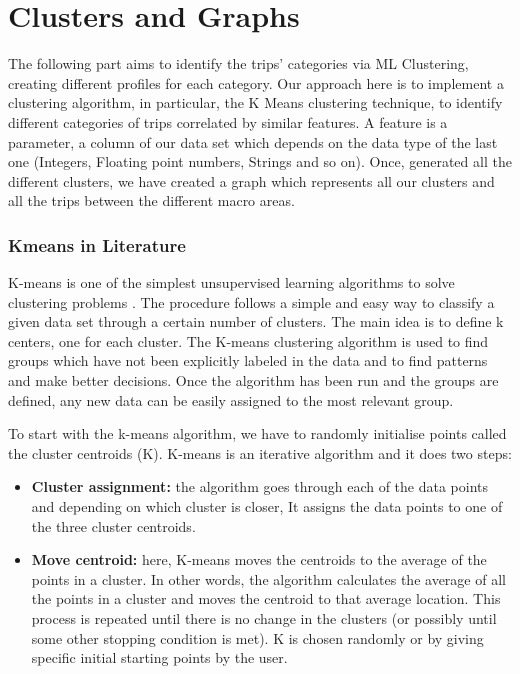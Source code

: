 \section{Clusters and Graphs}
The following part aims to identify the trips’ categories via ML Clustering, creating different profiles for each category.
Our approach here is to implement a clustering algorithm, in particular, the K Means clustering technique, to identify different categories of trips correlated by similar features. A feature is a parameter, a column of our data set which depends on the data type of the last one (Integers, Floating point numbers, Strings and so on).
Once, generated all the different clusters, we have created a graph which represents all our clusters and all the trips between the different macro areas.

\subsubsection{Kmeans in Literature }
K-means is one of the simplest unsupervised learning algorithms to solve clustering problems \cite{website:kmeansmedium}. The procedure follows a simple and easy way to classify a given data set through a certain number of clusters. The main idea is to define k centers, one for each cluster.
The K-means clustering algorithm is used to find groups which have not been explicitly labeled in the data and to find patterns and make better decisions. Once the algorithm has been run and the groups are defined, any new data can be easily assigned to the most relevant group.

To start with the k-means algorithm, we have to randomly initialise points called the cluster centroids (K). K-means is an iterative algorithm and it does two steps:
\begin{itemize}
    \item \textbf{Cluster assignment:} the algorithm goes through each of the data points and depending on which cluster is closer, It assigns the data points to one of the three cluster centroids.
    \item \textbf{Move centroid:} here, K-means moves the centroids to the average of the points in a cluster. In other words, the algorithm calculates the average of all the points in a cluster and moves the centroid to that average location. This process is repeated until there is no change in the clusters (or possibly until some other stopping condition is met). K is chosen randomly or by giving specific initial starting points by the user.
\end{itemize}


